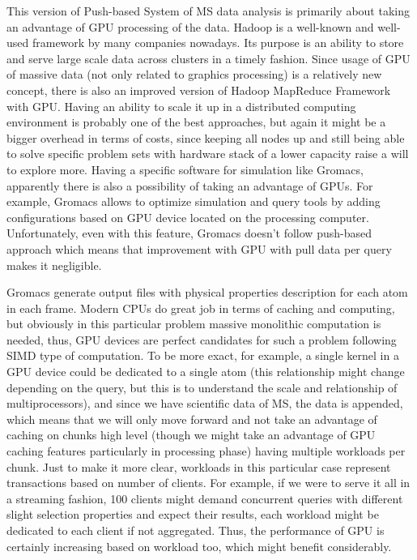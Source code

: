 \documentclass[10pt,journal,final,letterpaper,twocolumn]{IEEEtran}
\begin{document}
This version of Push-based System of MS data analysis is primarily about taking an advantage of GPU processing of the data. Hadoop is a well-known and well-used framework by many companies nowadays\cite{hadoop}. Its purpose is an ability to store and serve large scale data across clusters in a timely fashion. Since usage of GPU of massive data (not only related to graphics processing) is a relatively new concept, there is also an improved version of Hadoop MapReduce Framework with GPU\cite{hadoopgpu}. Having an ability to scale it up in a distributed computing environment is probably one of the best approaches, but again it might be a bigger overhead in terms of costs, since keeping all nodes up and still being able to solve specific problem sets with hardware stack of a lower capacity raise a will to explore more. Having a specific software for simulation like Gromacs, apparently there is also a possibility of taking an advantage of GPUs. For example, Gromacs allows to optimize simulation and query tools by adding configurations based on GPU device located on the processing computer. Unfortunately, even with this feature, Gromacs doesn't follow push-based approach which means that improvement with GPU with pull data per query makes it negligible.

Gromacs generate output files with physical properties description for each atom in each frame. Modern CPUs do great job in terms of caching and computing, but obviously in this particular problem massive monolithic computation is needed, thus, GPU devices are perfect candidates for such a problem following SIMD type of computation. To be more exact, for example, a single kernel in a GPU device could be dedicated to a single atom (this relationship might change depending on the query, but this is to understand the scale and relationship of multiprocessors), and since we have scientific data of MS, the data is appended, which means that we will only move forward and not take an advantage of caching on chunks high level (though we might take an advantage of GPU caching features particularly in processing phase) having multiple workloads per chunk. Just to make it more clear, workloads in this particular case represent transactions based on number of clients. For example, if we were to serve it all in a streaming fashion, 100 clients might demand concurrent queries with different slight selection properties and expect their results, each workload might be dedicated to each client if not aggregated. Thus, the performance of GPU is certainly increasing based on workload too, which might benefit considerably.
\end{document}
